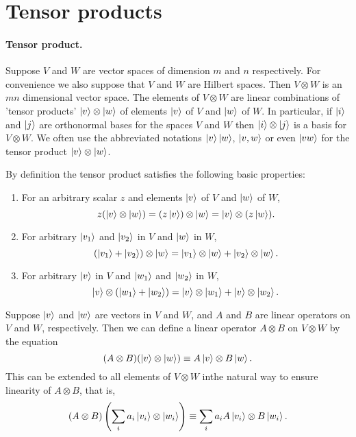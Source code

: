 \section{Tensor products}

\paragraph{Tensor product.} Suppose $V$ and $W$ are vector spaces of dimension
$m$ and $n$ respectively. For convenience we also suppose that $V$ and $W$ are
Hilbert spaces. Then $V \otimes W$ is an $mn$ dimensional vector space. The
elements of $V \otimes W$ are linear combinations of 'tensor products' $\ket{v}
\otimes \ket{w}$ of elements $\ket{v}$ of $V$ and $\ket{w}$ of $W$. In
particular, if $\ket{i}$ and $\ket{j}$ are orthonormal bases for the spaces $V$
and $W$ then $\ket{i} \otimes \ket{j}$ is a basis for $V \otimes W$. We often
use the abbreviated notations $\ket{v}\ket{w}$, $\ket{v, w}$ or even $\ket{vw}$
for the tensor product $\ket{v} \otimes \ket{w}$.

By definition the tensor product satisfies the following basic properties:
\begin{enumerate}
  \item For an arbitrary scalar $z$ and elements $\ket{v}$ of $V$ and $\ket{w}$
    of $W$, \begin{equation*}
      z(\ket{v} \otimes \ket{w}) = (z\ket{v}) \otimes \ket{w} = \ket{v} \otimes
        (z\ket{w}).
  \end{equation*}
  \item For arbitrary $\ket{v_1}$ and $\ket{v_2}$ in $V$ and $\ket{w}$ in $W$,
    \begin{equation*}
      (\ket{v_1} + \ket{v_2}) \otimes \ket{w} = \ket{v_1} \otimes \ket{w} +
        \ket{v_2} \otimes \ket{w}.
    \end{equation*}
  \item For arbitrary $\ket{v}$ in $V$ and $\ket{w_1}$ and $\ket{w_2}$ in $W$,
    \begin{equation*}
      \ket{v} \otimes (\ket{w_1} + \ket{w_2}) = \ket{v} \otimes \ket{w_1} +
        \ket{v} \otimes \ket{w_2}.
    \end{equation*}
\end{enumerate}

Suppose $\ket{v}$ and $\ket{w}$ are vectors in $V$ and $W$, and $A$ and $B$ are
linear operators on $V$ and $W$, respectively. Then we can define a linear
operator $A \otimes B$ on $V \otimes W$ by the equation \begin{equation*}
  (A \otimes B)(\ket{v} \otimes \ket{w}) \equiv A\ket{v} \otimes B\ket{w}.
\end{equation*}
This can be extended to all elements of $V \otimes W$ inthe natural way to
ensure linearity of $A \otimes B$, that is, \begin{equation*}
  (A \otimes B)\left(\sum_i a_i\ket{v_i} \otimes \ket{w_i}\right)
    \equiv \sum_i a_iA\ket{v_i} \otimes B\ket{w_i}.
\end{equation*}

